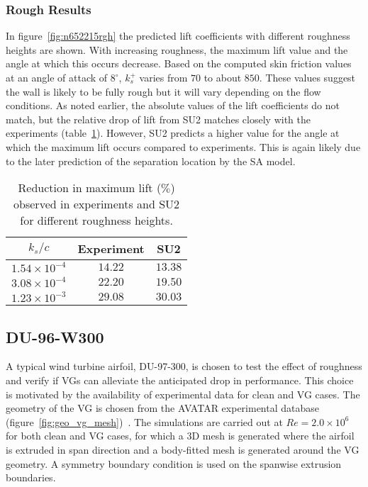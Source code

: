 \subsubsection{Rough Results}
In figure~\ref{fig:n652215rgh} the predicted lift coefficients with different roughness heights are shown. With increasing roughness, the maximum lift value and the angle at which this occurs decrease. Based on the computed skin friction values at an angle of attack of $8^\circ$, $k_s^+$ varies from $70$ to about $850$. These values suggest the wall is likely to be fully rough but it will vary depending on the flow conditions. As noted earlier, the absolute values of the lift coefficients do not match, but the relative drop of lift from SU2 matches closely with the experiments (table~\ref{tab:maxcl}). However, SU2 predicts a higher value for the angle at which the maximum lift occurs compared to experiments. This is again likely due to the later prediction of the separation location by the SA model.%
\begin{table}[h!]
\centering
\begin{tabular}{ |c|c|c| } 
\hline
$k_s/c$ & Experiment & SU2 \\
 \hline
 $1.54\times10^{-4}$ & $14.22$ & $13.38$ \\ 
 $3.08\times10^{-4}$ & $22.20$ & $19.50$ \\ 
 $1.23\times10^{-3}$ & $29.08$ & $30.03$ \\ 
 \hline
\end{tabular}
\caption{Reduction in maximum lift ($\%$) observed in experiments and SU2 for different roughness heights.}
\label{tab:maxcl}
\end{table}
\subsection{DU-96-W300}
A typical wind turbine airfoil, DU-97-300, is chosen to test the effect of roughness and verify if VGs can alleviate the anticipated drop in performance. This choice is motivated by the availability of experimental data for clean and VG cases. The geometry of the VG is chosen from the AVATAR experimental database (figure~\ref{fig:geo_vg_mesh})~\cite{Schepers_2018,baldacchino2018experimental}. The simulations are carried out at $Re=2.0\times10^6$ for both clean and VG cases, for which a 3D mesh is generated where the airfoil is extruded in span direction and a body-fitted mesh is generated around the VG geometry. A symmetry boundary condition is used on the spanwise extrusion boundaries.

